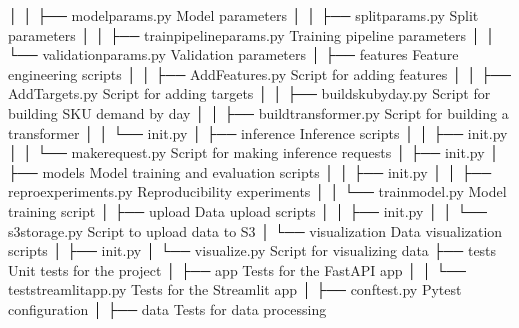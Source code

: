 \documentclass[letterpaper,10pt,english]{sphinxmanual}
\begin{document}
\begin{sphinxVerbatim}[commandchars=\\\{\}]
│   │   ├── model\PYGZus{}params.py  \PYGZlt{}\PYGZhy{}\PYGZhy{}\PYGZhy{} Model parameters
│   │   ├── split\PYGZus{}params.py  \PYGZlt{}\PYGZhy{}\PYGZhy{}\PYGZhy{} Split parameters
│   │   ├── train\PYGZus{}pipeline\PYGZus{}params.py  \PYGZlt{}\PYGZhy{}\PYGZhy{}\PYGZhy{} Training pipeline parameters
│   │   └── validation\PYGZus{}params.py  \PYGZlt{}\PYGZhy{}\PYGZhy{}\PYGZhy{} Validation parameters
│   ├── features               \PYGZlt{}\PYGZhy{}\PYGZhy{}\PYGZhy{} Feature engineering scripts
│   │   ├── AddFeatures.py  \PYGZlt{}\PYGZhy{}\PYGZhy{}\PYGZhy{} Script for adding features
│   │   ├── AddTargets.py  \PYGZlt{}\PYGZhy{}\PYGZhy{}\PYGZhy{} Script for adding targets
│   │   ├── build\PYGZus{}sku\PYGZus{}by\PYGZus{}day.py  \PYGZlt{}\PYGZhy{}\PYGZhy{}\PYGZhy{} Script for building SKU demand by day
│   │   ├── build\PYGZus{}transformer.py  \PYGZlt{}\PYGZhy{}\PYGZhy{}\PYGZhy{} Script for building a transformer
│   │   └── \PYGZus{}\PYGZus{}init\PYGZus{}\PYGZus{}.py
│   ├── inference              \PYGZlt{}\PYGZhy{}\PYGZhy{}\PYGZhy{} Inference scripts
│   │   ├── \PYGZus{}\PYGZus{}init\PYGZus{}\PYGZus{}.py
│   │   └── make\PYGZus{}request.py    \PYGZlt{}\PYGZhy{}\PYGZhy{}\PYGZhy{} Script for making inference requests
│   ├── \PYGZus{}\PYGZus{}init\PYGZus{}\PYGZus{}.py
│   ├── models                 \PYGZlt{}\PYGZhy{}\PYGZhy{}\PYGZhy{} Model training and evaluation scripts
│   │   ├── \PYGZus{}\PYGZus{}init\PYGZus{}\PYGZus{}.py
│   │   ├── repro\PYGZus{}experiments.py \PYGZlt{}\PYGZhy{}\PYGZhy{}\PYGZhy{} Reproducibility experiments
│   │   └── train\PYGZus{}model.py     \PYGZlt{}\PYGZhy{}\PYGZhy{}\PYGZhy{} Model training script
│   ├── upload                 \PYGZlt{}\PYGZhy{}\PYGZhy{}\PYGZhy{} Data upload scripts
│   │   ├── \PYGZus{}\PYGZus{}init\PYGZus{}\PYGZus{}.py
│   │   └── s3\PYGZus{}storage.py      \PYGZlt{}\PYGZhy{}\PYGZhy{}\PYGZhy{} Script to upload data to S3
│   └── visualization          \PYGZlt{}\PYGZhy{}\PYGZhy{}\PYGZhy{} Data visualization scripts
│       ├── \PYGZus{}\PYGZus{}init\PYGZus{}\PYGZus{}.py
│       └── visualize.py       \PYGZlt{}\PYGZhy{}\PYGZhy{}\PYGZhy{} Script for visualizing data
├── tests                  \PYGZlt{}\PYGZhy{}\PYGZhy{}\PYGZhy{} Unit tests for the project
│   ├── app                    \PYGZlt{}\PYGZhy{}\PYGZhy{}\PYGZhy{} Tests for the FastAPI app
│   │   └── test\PYGZus{}streamlit\PYGZus{}app.py  \PYGZlt{}\PYGZhy{}\PYGZhy{}\PYGZhy{} Tests for the Streamlit app
│   ├── conftest.py          \PYGZlt{}\PYGZhy{}\PYGZhy{}\PYGZhy{} Pytest configuration
│   ├── data                   \PYGZlt{}\PYGZhy{}\PYGZhy{}\PYGZhy{} Tests for data processing

\end{sphinxVerbatim}
\end{document}
